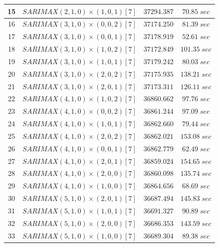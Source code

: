 \documentclass[conference]{IEEEtran}
\begin{document}
\begin{table}[htbp]
\begin{tabular}{|c|c|c|c|}
        \hline
        15 &  $SARIMAX(2, 1, 0) \times (1, 0, 1)[7]$ & $37294.387$ & $70.85 \; sec$ \\
        \hline
        16 &  $SARIMAX(3, 1, 0) \times (0, 0, 2)[7]$ & $37174.250$ & $81.39 \; sec$ \\
        \hline
        17 &  $SARIMAX(3, 1, 0) \times (0, 0, 1)[7]$ & $37178.919$ & $52.61 \; sec$ \\
        \hline
        18 &  $SARIMAX(3, 1, 0) \times (1, 0, 2)[7]$ & $37172.849$ & $101.35 \; sec$ \\
        \hline
        19 &  $SARIMAX(3, 1, 0) \times (1, 0, 1)[7]$ & $37179.242$ & $80.03 \; sec$ \\
        \hline
        20 &  $SARIMAX(3, 1, 0) \times (2, 0, 2)[7]$ & $37175.935$ & $138.21 \; sec$ \\
        \hline
        21 &  $SARIMAX(3, 1, 0) \times (2, 0, 1)[7]$ & $37173.311$ & $126.11 \; sec$ \\
        \hline
        22 &  $SARIMAX(4, 1, 0) \times (1, 0, 2)[7]$ & $36860.662$ & $97.76 \; sec$ \\
        \hline
        23 &  $SARIMAX(4, 1, 0) \times (0, 0, 2)[7]$ & $36861.244$ & $97.09 \; sec$ \\
        \hline
        24 &  $SARIMAX(4, 1, 0) \times (1, 0, 1)[7]$ & $36862.660$ & $79.44 \; sec$ \\
        \hline
        25 &  $SARIMAX(4, 1, 0) \times (2, 0, 2)[7]$ & $36862.021$ & $153.08 \; sec$ \\
        \hline
        26 &  $SARIMAX(4, 1, 0) \times (0, 0, 1)[7]$ & $36862.779$ & $62.49 \; sec$ \\
        \hline
        27 &  $SARIMAX(4, 1, 0) \times (2, 0, 1)[7]$ & $36859.024$ & $154.65 \; sec$ \\
        \hline
        28 &  $SARIMAX(4, 1, 0) \times (2, 0, 0)[7]$ & $36860.098$ & $135.74 \; sec$ \\
        \hline
        29 &  $SARIMAX(4, 1, 0) \times (1, 0, 0)[7]$ & $36864.656$ & $68.69 \; sec$ \\
        \hline
        30 &  $SARIMAX(5, 1, 0) \times (2, 0, 1)[7]$ & $36687.494$ & $145.83 \; sec$ \\
        \hline
        31 &  $SARIMAX(5, 1, 0) \times (1, 0, 1)[7]$ & $36691.327$ & $90.89 \; sec$ \\
        \hline
        32 &  $SARIMAX(5, 1, 0) \times (2, 0, 0)[7]$ & $36686.353$ & $143.59 \; sec$ \\
        \hline
        33 &  $SARIMAX(5, 1, 0) \times (1, 0, 0)[7]$ & $36689.304$ & $89.38 \; sec$ \\

\end{tabular}
\end{table}
\end{document}
